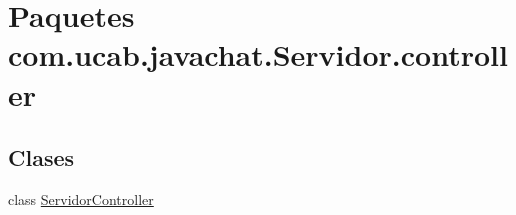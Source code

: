 \hypertarget{namespacecom_1_1ucab_1_1javachat_1_1_servidor_1_1controller}{\section{Paquetes com.\-ucab.\-javachat.\-Servidor.\-controller}
\label{namespacecom_1_1ucab_1_1javachat_1_1_servidor_1_1controller}
}
\subsection*{Clases}
\begin{DoxyCompactItemize}
\item 
class \hyperlink{classcom_1_1ucab_1_1javachat_1_1_servidor_1_1controller_1_1_servidor_controller}{Servidor\-Controller}
\end{DoxyCompactItemize}
